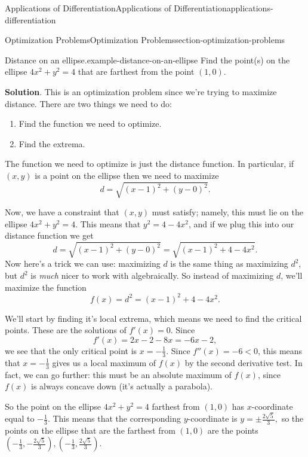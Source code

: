 \documentclass[oneside,10pt,]{book}
\numberwithin{equation}{section}
\begin{document}
\begin{chapterptx}{Applications of Differentiation}{}{Applications of Differentiation}{}{}{applications-differentiation}
\begin{sectionptx}{Optimization Problems}{}{Optimization Problems}{}{}{section-optimization-problems}
\begin{example}{Distance on an ellipse.}{example-distance-on-an-ellipse}
\hypertarget{p-361}{}%
Find the point(s) on the ellipse \(4x^{2} + y^{2} = 4\) that are farthest from the point \((1,0)\).%
\par\smallskip%
\noindent\textbf{Solution}.\hypertarget{solution-80}{}\quad%
\hypertarget{p-362}{}%
This is an optimization problem since we're trying to maximize distance. There are two things we need to do:\leavevmode%
\begin{enumerate}
\item\hypertarget{li-26}{}Find the function we need to optimize.%
\item\hypertarget{li-27}{}Find the extrema.%
\end{enumerate}
The function we need to optimize is just the distance function. In particular, if \((x,y)\) is a point on the ellipse then we need to maximize%
\begin{equation*}
d = \sqrt{(x-1)^{2} + (y-0)^{2}}.
\end{equation*}
%
\par
\hypertarget{p-363}{}%
Now, we have a constraint that \((x,y)\) must satisfy; namely, this must lie on the ellipse \(4x^{2} + y^{2} = 4\). This means that \(y^{2} = 4 - 4x^{2}\), and if we plug this into our distance function we get%
\begin{equation*}
d = \sqrt{(x-1)^{2} + (y-0)^{2}} = \sqrt{(x-1)^{2} + 4 - 4x^{2}}.
\end{equation*}
Now here's a trick we can use: maximizing \(d\) is the same thing as maximizing \(d^{2}\), but \(d^{2}\) is \emph{much} nicer to work with algebraically. So instead of maximizing \(d\), we'll maximize the function%
\begin{equation*}
f(x) = d^{2} = (x-1)^{2} + 4 - 4x^{2}.
\end{equation*}
%
\par
\hypertarget{p-364}{}%
We'll start by finding it's local extrema, which means we need to find the critical points. These are the solutions of \(f'(x) = 0\). Since%
\begin{equation*}
f'(x) = 2x - 2 - 8x = -6x - 2,
\end{equation*}
we see that the only critical point is \(x = -\frac{1}{3}\). Since \(f''(x) = -6 < 0\), this means that \(x = -\frac{1}{3}\) gives us a local maximum of \(f(x)\) by the second derivative test. In fact, we can go further: this must be an absolute maximum of \(f(x)\), since \(f(x)\) is always concave down (it's actually a parabola).%
\par
\hypertarget{p-365}{}%
So the point on the ellipse \(4x^{2} + y^{2} = 4\) farthest from \((1,0)\) has \(x\)-coordinate equal to \(-\frac{1}{3}\). This means that the corresponding \(y\)-coordinate is \(y = \pm\frac{2\sqrt{5}}{3},\) so the points on the ellipse that are the farthest from \((1,0)\) are the points \((-\frac{1}{3}, -\frac{2\sqrt{5}}{3}), (-\frac{1}{3}, \frac{2\sqrt{5}}{3}).\)%

\end{example}
\end{sectionptx}
\end{chapterptx}
\end{document}
